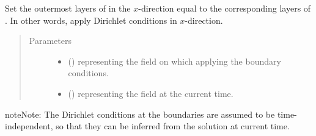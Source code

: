 \documentclass[letterpaper,10pt,english]{sphinxmanual}
\begin{document}
\begin{fulllineitems}
\begin{fulllineitems}
\begin{quote}
\begin{description}
\end{description}\end{quote}

\end{fulllineitems}


\begin{fulllineitems}
\label{\detokenize{api:tasmania.dycore.horizontal_boundary_relaxed.RelaxedXZ.set_outermost_layers_x}}
Set the outermost layers of  in the \(x\)-direction equal to the corresponding
layers of . In other words, apply Dirichlet conditions in \(x\)-direction.
\begin{quote}\begin{description}
\item[{Parameters}] \leavevmode\begin{itemize}
\item {} 
 () \textendash{}  representing the field on which applying the boundary conditions.

\item {} 
 () \textendash{}  representing the field at the current time.

\end{itemize}

\end{description}\end{quote}

\begin{sphinxadmonition}{note}{Note:}
The Dirichlet conditions at the boundaries are assumed to be time-independent, so that they
can be inferred from the solution at current time.
\end{sphinxadmonition}

\end{fulllineitems}


\end{fulllineitems}
\end{document}

